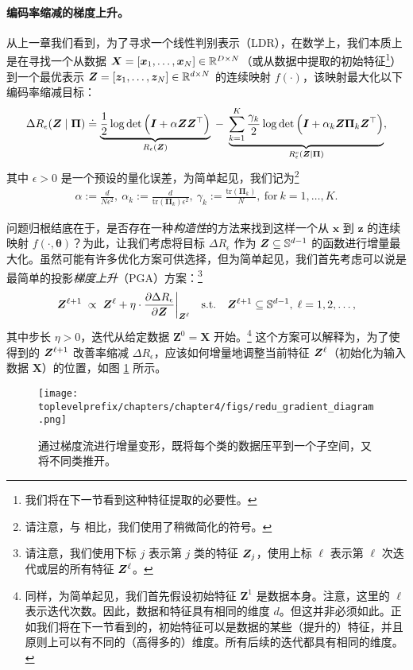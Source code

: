 \documentclass[../../book-main.tex]{subfiles}
\begin{document}
\paragraph{编码率缩减的梯度上升。} 从上一章我们看到，为了寻求一个线性判别表示（LDR），在数学上，我们本质上是在寻找一个从数据 $\bm{X} = [\bm{x}_1, \ldots, \bm{x}_N] \in \mathbb{R}^{D \times N}$（或从数据中提取的初始特征\footnote{我们将在下一节看到这种特征提取的必要性。}）到一个最优表示 $\bm{Z} = [\bm{z}_1, \ldots, \bm{z}_N] \in \mathbb{R}^{d \times N}$ 的连续映射 $f(\cdot)$，该映射最大化以下编码率缩减目标：
\begin{equation}\label{eq:mcr-formulation}
\begin{split}
\Delta R_{\epsilon}(\bm{Z} \mid \bm{\Pi}) \doteq \underbrace{\frac{1}{2}\log\det \Big(\bm{I} + {\alpha} \bm{Z} \bm{Z}^{\top} \Big)}_{R_{\epsilon}(\bm{Z})} \;-\; \underbrace{\sum_{k=1}^{K}\frac{\gamma_{k}}{2} \log\det\Big(\bm{I} + {\alpha_{k}} \bm{Z} \bm{\Pi}_{k} \bm{Z}^{\top} \Big)}_{R_{\epsilon}^c(\bm{Z} \mid \bm \Pi)},
\end{split}
\end{equation}
其中 $\epsilon > 0$ 是一个预设的量化误差，为简单起见，我们记为\footnote{请注意，与  相比，我们使用了稍微简化的符号。}
\begin{align*}
    \alpha := \frac{d}{N\epsilon^2},\ \alpha_{k} := \frac{d}{\mathrm{tr}(\bm{\Pi}_{k})\epsilon^2},\ \gamma_{k} := \frac{\mathrm{tr}(\bm{\Pi}_{k})}{N},\ \text{for}\ k = 1,\ldots, K.
\end{align*}

问题归根结底在于，是否存在一种{\em 构造性}的方法来找到这样一个从 $\bm x$ 到 $\bm z$ 的连续映射 $f(\cdot,\bm \theta)$？为此，让我们考虑将目标 $\Delta R_{\epsilon}$ 作为 $\bm{Z} \subseteq \mathbb{S}^{d-1}$ 的函数进行增量最大化。虽然可能有许多优化方案可供选择，但为简单起见，我们首先考虑可以说是最简单的投影{\em 梯度上升}（PGA）方案：\footnote{请注意，我们使用下标 $j$ 表示第 $j$ 类的特征 $\bm{Z}_j$，使用上标 $\ell$ 表示第 $\ell$ 次迭代或层的所有特征 $\bm{Z}^{\ell}$。}
\begin{equation}
\bm Z^{\ell+1}   \; \propto \; \bm Z^{\ell} + \eta \cdot \frac{\partial \Delta R_{\epsilon}}{\partial \bm Z}\bigg|_{\bm{Z}^{\ell}}
\quad \mbox{s.t.} \quad \bm{Z}^{\ell+1} \subseteq \mathbb{S}^{d-1}, \; \ell = 1, 2, \ldots,
\label{eqn:gradient-descent}
\end{equation}
其中步长 $\eta >0$，迭代从给定数据 $\bm Z^{0} = \bm X$ 开始。\footnote{同样，为简单起见，我们首先假设初始特征 $\bm Z^{1}$ 是数据本身。注意，这里的 $\ell$ 表示迭代次数。因此，数据和特征具有相同的维度 $d$。但这并非必须如此。正如我们将在下一节看到的，初始特征可以是数据的某些（提升的）特征，并且原则上可以有不同的（高得多的）维度。所有后续的迭代都具有相同的维度。}
这个方案可以解释为，为了使得到的 $\bm{Z}^{\ell +1}$ 改善率缩减 $\Delta R_{\epsilon}$，应该如何增量地调整当前特征 $\bm{Z}^\ell$（初始化为输入数据 $\bm X$）的位置，如图 \ref{fig:gradient-flow} 所示。
\begin{figure}
\centering
    \texttt{[image: \\toplevelprefix/chapters/chapter4/figs/redu\_gradient\_diagram.png]}
    \caption{通过梯度流进行增量变形，既将每个类的数据压平到一个子空间，又将不同类推开。}
    \label{fig:gradient-flow}
\end{figure}
\end{document}
